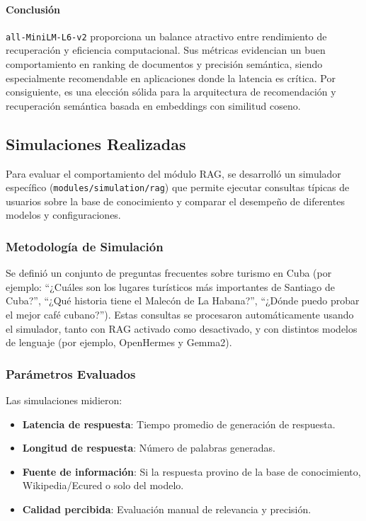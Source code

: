 \documentclass[runningheads]{llncs}
\begin{document}
\paragraph{Conclusión}

\texttt{all‑MiniLM‑L6‑v2} proporciona un balance atractivo entre rendimiento de recuperación y eficiencia computacional. Sus métricas evidencian un buen comportamiento en ranking de documentos y precisión semántica, siendo especialmente recomendable en aplicaciones donde la latencia es crítica. Por consiguiente, es una elección sólida para la arquitectura de recomendación y recuperación semántica basada en embeddings con similitud coseno.


\subsection{Simulaciones Realizadas}

Para evaluar el comportamiento del módulo RAG, se desarrolló un simulador específico (\texttt{modules/simulation/rag}) que permite ejecutar consultas típicas de usuarios sobre la base de conocimiento y comparar el desempeño de diferentes modelos y configuraciones.

\subsubsection{Metodología de Simulación}

Se definió un conjunto de preguntas frecuentes sobre turismo en Cuba (por ejemplo: ``¿Cuáles son los lugares turísticos más importantes de Santiago de Cuba?'', ``¿Qué historia tiene el Malecón de La Habana?'', ``¿Dónde puedo probar el mejor café cubano?''). Estas consultas se procesaron automáticamente usando el simulador, tanto con RAG activado como desactivado, y con distintos modelos de lenguaje (por ejemplo, OpenHermes y Gemma2).

\subsubsection{Parámetros Evaluados}

Las simulaciones midieron:
\begin{itemize}
    \item \textbf{Latencia de respuesta}: Tiempo promedio de generación de respuesta.
    \item \textbf{Longitud de respuesta}: Número de palabras generadas.
    \item \textbf{Fuente de información}: Si la respuesta provino de la base de conocimiento, Wikipedia/Ecured o solo del modelo.
    \item \textbf{Calidad percibida}: Evaluación manual de relevancia y precisión.
\end{itemize}
\end{document}
